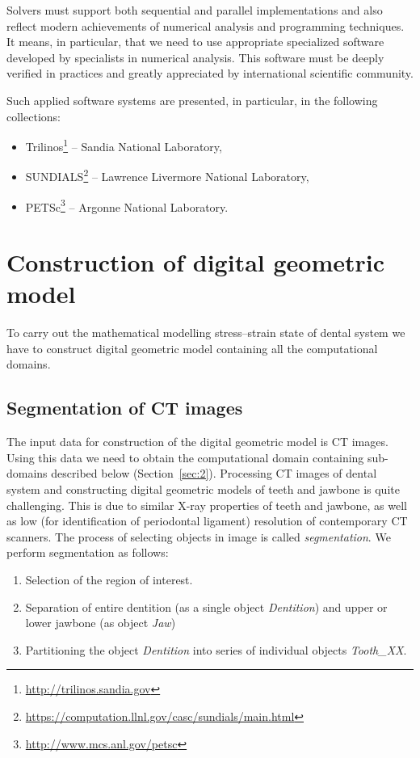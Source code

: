 \documentclass{elsarticle}
\begin{document}
Solvers must support both sequential and parallel implementations and also reflect modern achievements of 
numerical analysis and programming techniques.
It means, in particular, that we need to use appropriate specialized software developed by specialists in 
numerical analysis.
This software must be deeply verified in practices and greatly appreciated by international scientific community.

Such applied software systems are presented, in particular, in the following collections:
\begin{itemize}
 \item[\textbullet]	\textsf{Trilinos}\footnote{\url{http://trilinos.sandia.gov}} -- Sandia National Laboratory,
 \item[\textbullet] \textsf{SUNDIALS}\footnote{\url{https://computation.llnl.gov/casc/sundials/main.html}} -- 
 Lawrence Livermore National Laboratory,
 \item[\textbullet]  \textsf{PETSc}\footnote{\url{http://www.mcs.anl.gov/petsc}} --  Argonne National Laboratory.
\end{itemize} 


  
\section{Construction of digital geometric model}

To carry out the mathematical modelling stress--strain state of dental
system we have to construct digital geometric model containing all the
computational domains.

\subsection{Segmentation of CT images}

The input data for construction of the digital geometric model is CT
images. Using this data we need to obtain the computational domain
containing sub-domains described below
(Section~\ref{sec:2}). Processing CT images of dental system and
constructing digital geometric models of teeth and jawbone is quite
challenging. This is due to similar X-ray properties of teeth and jawbone,
as well as low (for identification of periodontal ligament) resolution of
contemporary CT scanners. The process of selecting objects in image is
called \emph{segmentation}. We perform segmentation as follows:
\begin{enumerate}
\item Selection of the region of interest.
\item Separation of entire dentition (as a single object \emph{Dentition})
  and upper or lower jawbone (as object \emph{Jaw})
\item Partitioning the object \emph{Dentition} into series of
  individual objects \emph{Tooth\_XX}.
\end{enumerate}
\end{document}

